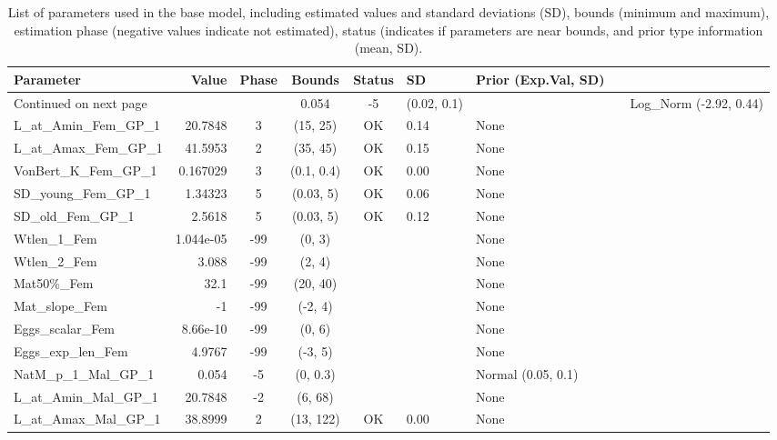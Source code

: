 \documentclass[12pt,]{article}
\begin{document}
\begin{landscape}
\begin{longtable}{lrcccll}
\caption{List of parameters used in
                                          the base model, including estimated 
                                          values and standard deviations (SD), 
                                          bounds (minimum and maximum), 
                                          estimation phase (negative values indicate
                                          not estimated), status (indicates if 
                                          parameters are near bounds, and prior type
                                          information (mean, SD).} \\ 
  \hline
Parameter & Value & Phase & Bounds & Status & SD & Prior (Exp.Val, SD)  \\ 
  \hline 
\endhead 
\hline 
\multicolumn{3}{l}{\footnotesize Continued on next page} 
\endfoot 
\endlastfoot 
 \hline
NatM\_p\_1\_Fem\_GP\_1 & 0.054 & -5 & (0.02, 0.1) &  &  & Log\_Norm (-2.92, 0.44) \\ 
  L\_at\_Amin\_Fem\_GP\_1 & 20.7848 & 3 & (15, 25) & OK & 0.14 & None \\ 
  L\_at\_Amax\_Fem\_GP\_1 & 41.5953 & 2 & (35, 45) & OK & 0.15 & None \\ 
  VonBert\_K\_Fem\_GP\_1 & 0.167029 & 3 & (0.1, 0.4) & OK & 0.00 & None \\ 
  SD\_young\_Fem\_GP\_1 & 1.34323 & 5 & (0.03, 5) & OK & 0.06 & None \\ 
  SD\_old\_Fem\_GP\_1 & 2.5618 & 5 & (0.03, 5) & OK & 0.12 & None \\ 
  Wtlen\_1\_Fem & 1.044e-05 & -99 & (0, 3) &  &  & None \\ 
  Wtlen\_2\_Fem & 3.088 & -99 & (2, 4) &  &  & None \\ 
  Mat50\%\_Fem & 32.1 & -99 & (20, 40) &  &  & None \\ 
  Mat\_slope\_Fem & -1 & -99 & (-2, 4) &  &  & None \\ 
  Eggs\_scalar\_Fem & 8.66e-10 & -99 & (0, 6) &  &  & None \\ 
  Eggs\_exp\_len\_Fem & 4.9767 & -99 & (-3, 5) &  &  & None \\ 
  NatM\_p\_1\_Mal\_GP\_1 & 0.054 & -5 & (0, 0.3) &  &  & Normal (0.05, 0.1) \\ 
  L\_at\_Amin\_Mal\_GP\_1 & 20.7848 & -2 & (6, 68) &  &  & None \\ 
  L\_at\_Amax\_Mal\_GP\_1 & 38.8999 & 2 & (13, 122) & OK & 0.00 & None \\ 

\end{longtable}
\end{landscape}
\end{document}
